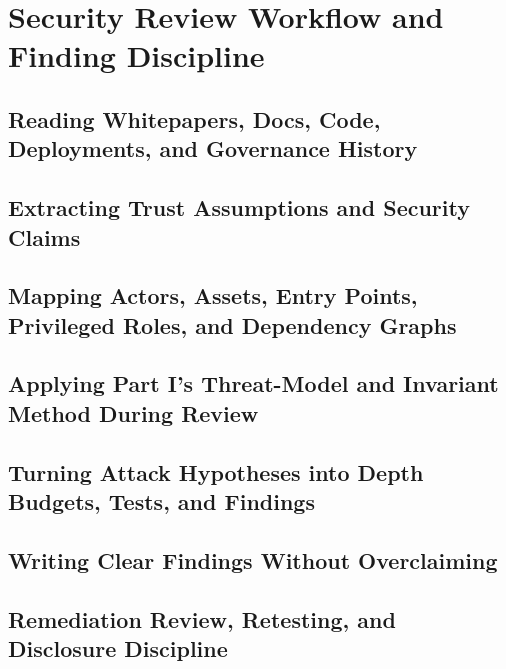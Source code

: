 \chapter{Security Review Workflow and Finding Discipline}

\section{Reading Whitepapers, Docs, Code, Deployments, and Governance History}

\section{Extracting Trust Assumptions and Security Claims}

\section{Mapping Actors, Assets, Entry Points, Privileged Roles, and Dependency Graphs}

\section{Applying Part I's Threat-Model and Invariant Method During Review}

\section{Turning Attack Hypotheses into Depth Budgets, Tests, and Findings}

\section{Writing Clear Findings Without Overclaiming}

\section{Remediation Review, Retesting, and Disclosure Discipline}
